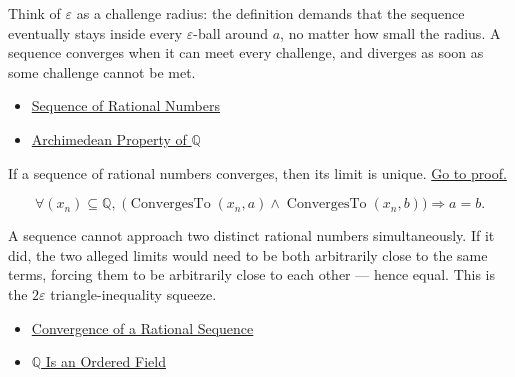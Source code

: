 \begin{remark*}[Interpretation]
Think of $\varepsilon$ as a challenge radius: the definition demands that the
sequence eventually stays inside every $\varepsilon$-ball around $a$, no
matter how small the radius. A sequence converges when it can meet every
challenge, and diverges as soon as some challenge cannot be met.
\end{remark*}

\begin{dependencies}
\begin{itemize}
  \item \hyperref[def:rational-sequence]{Sequence of Rational Numbers}
  \item \hyperref[thm:archimedean-q]{Archimedean Property of $\mathbb{Q}$}
\end{itemize}
\end{dependencies}

\begin{theorem}
\label{thm:limit-unique-q}
If a sequence of rational numbers converges, then its limit is unique.
\hyperref[prf:limit-unique-q]{Go to proof.}
\end{theorem}

\begin{remark*}
\[
\forall (x_n) \subseteq \mathbb{Q},\;
\bigl(
\operatorname{ConvergesTo}(x_n, a) \land \operatorname{ConvergesTo}(x_n, b)
\bigr)
\Longrightarrow a = b.
\]
\end{remark*}

\begin{remark*}[Interpretation]
A sequence cannot approach two distinct rational numbers simultaneously.
If it did, the two alleged limits would need to be both arbitrarily close to
the same terms, forcing them to be arbitrarily close to each other --- hence
equal. This is the $2\varepsilon$ triangle-inequality squeeze.
\end{remark*}

\begin{dependencies}
\begin{itemize}
  \item \hyperref[def:convergent-rational-sequence]{Convergence of a Rational Sequence}
  \item \hyperref[thm:q-is-ordered-field]{$\mathbb{Q}$ Is an Ordered Field}
\end{itemize}
\end{dependencies}

